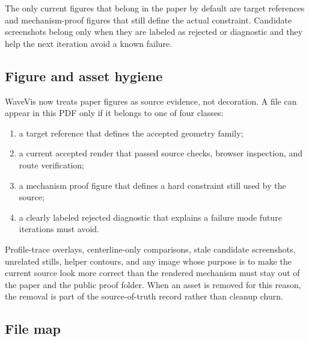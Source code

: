 \documentclass[12pt,letterpaper]{article}
\begin{document}
The only current figures that belong in the paper by default are target references and mechanism-proof figures that still define the actual constraint. Candidate screenshots belong only when they are labeled as rejected or diagnostic and they help the next iteration avoid a known failure.

\subsection{Figure and asset hygiene}

WaveVis now treats paper figures as source evidence, not decoration. A file can appear in this PDF only if it belongs to one of four classes:
\begin{enumerate}
  \item a target reference that defines the accepted geometry family;
  \item a current accepted render that passed source checks, browser inspection, and route verification;
  \item a mechanism proof figure that defines a hard constraint still used by the source;
  \item a clearly labeled rejected diagnostic that explains a failure mode future iterations must avoid.
\end{enumerate}
Profile-trace overlays, centerline-only comparisons, stale candidate screenshots, unrelated stills, helper contours, and any image whose purpose is to make the current source look more correct than the rendered mechanism must stay out of the paper and the public proof folder. When an asset is removed for this reason, the removal is part of the source-of-truth record rather than cleanup churn.

\subsection{File map}
\end{document}
